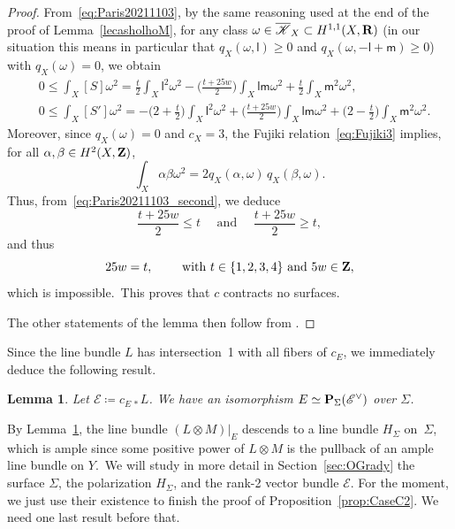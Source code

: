 \documentclass[12pt]{amsart}
\def\cE{\mathscr{E}}
\def\cK{\mathscr{K}}
\def\Z{{\bf Z}}
\def\R{{\bf R}}
\def\P{{\bf P}}
\def\isom{\simeq}
\def\cong{\isom}
\newtheorem{lemm}{Lemma}[section]
\theoremstyle{remark}
\def\lll{\ensuremath{\mathsf l}}
\def\mm{\ensuremath{\mathsf m}}
\begin{document}
\begin{proof}
From~\eqref{eq:Paris20211103}, by the same reasoning used at the end of the proof of Lemma~\ref{lecasholhoM}, for any class $\omega\in \overline{\cK}_X\subset H^{1,1}(X,\R)$ (in our situation this means in particular that $q_X(\omega,\lll)\ge0$ and $q_X(\omega,-\lll+\mm)\geq0$) with $q_X(\omega)=0$, we obtain
\begin{equation}\label{eq:Paris20211103_second}
\begin{split}
    & 0\leq \int_X [S]\omega^2 = \frac t2 \int_X\lll^2\omega^2- \Big(\frac {t+25w}2\Big)\int_X \lll\mm\omega^2 + \frac t2\int_X \mm^2\omega^2,  \\
    & 0\leq \int_X [S']\omega^2 = - \Big(2+\frac t2\Big)\int_X \lll^2\omega^2
     + \Big(\frac {t+25w}2\Big)\int_X \lll\mm\omega^2
     +\Big(2-\frac t2\Big)\int_X \mm^2\omega^2 .
\end{split}
\end{equation}
Moreover, since $q_X(\omega)=0$ and $c_X=3$,   the Fujiki relation~\eqref{eq:Fujiki3} implies, for all $\alpha,\beta\in H^2(X,\Z)$,
\[
\int_X \alpha\beta\omega^2 = 2 q_X(\alpha,\omega)\, q_X(\beta,\omega).
\]
Thus, from~\eqref{eq:Paris20211103_second}, we deduce
\[
\frac {t+25w}2  \leq t\quad\text{ and }\quad \frac {t+25w}2  \geq t,
\]
and thus
\[
25 w = t, \qquad \text{ with } t\in\{1,2,3,4\}\text{ and }5w\in\Z,
\]
which is impossible.\ This proves that $c$ contracts no surfaces.

The other statements of the lemma then follow from
\cite[Theorem~1.3(ii)]{wie}.
\end{proof}

Since the line bundle $L$ has intersection~1 with all fibers of $c_E$, we immediately deduce the following result.

\begin{lemm}\label{lem:EisP1bundle}
Let $\cE\coloneqq c_{E\,*}L$.
We have an isomorphism $E\cong\P_{\Sigma}(\cE^\vee)$ over $\Sigma$.
\end{lemm}

By Lemma~\ref{lem:EisP1bundle}, the line bundle $(L\otimes M)\vert_E$ descends to a line bundle $H_{\Sigma}$ on~$\Sigma$, which is ample since some positive power of $L\otimes M$ is the pullback of an ample line bundle on $Y$.\
We will study  in more detail in Section~\ref{sec:OGrady} the surface $\Sigma$, the polarization $H_{\Sigma}$, and the rank-2 vector bundle $\cE$.
For the moment, we just use their existence to finish the proof of Proposition~\ref{prop:CaseC2}.
We need one last result before that.
\end{document}
